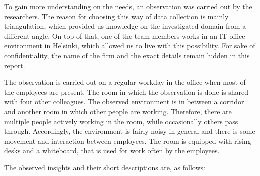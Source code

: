To gain more understanding on the needs, an observation was carried out by the researchers. The reason for choosing this way of data collection is mainly triangulation, which provided us knowledge on the investigated domain from a different angle. On top of that, one of the team members works in an IT office environment in Helsinki, which allowed us to live with this possibility. For sake of confidentiality, the name of the firm and the exact details remain hidden in this report. 

The observation is carried out on a regular workday in the office when most of the employees are present. The room in which the observation is done is shared with four other colleagues. The observed environment is in between a corridor and another room in which other people are working. Therefore, there are multiple people actively working in the room, while occasionally others pass through. Accordingly, the environment is fairly noisy in general and there is some movement and interaction between employees. The room is equipped with rising desks and a whiteboard, that is used for work often by the employees. 

The observed insights and their short descriptions are, as follows:

